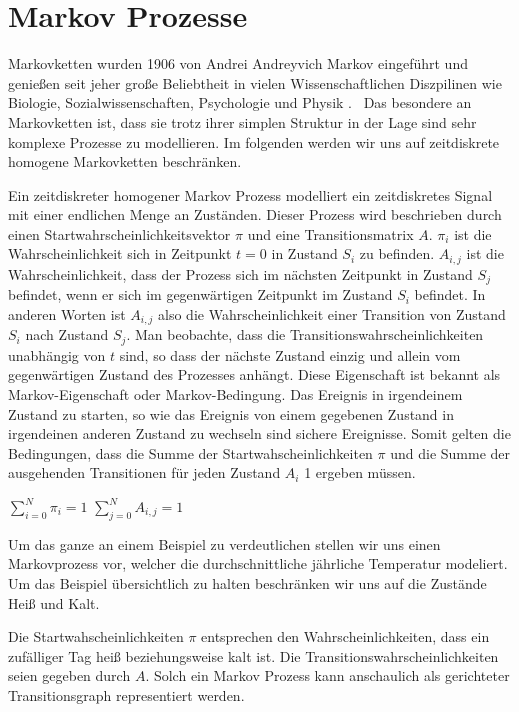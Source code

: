\section{Markov Prozesse}
Markovketten wurden 1906 von Andrei Andreyvich Markov eingeführt und 
genießen seit jeher große Beliebtheit in vielen Wissenschaftlichen 
Diszpilinen wie Biologie, Sozialwissenschaften, Psychologie und Physik .~\cite{gas}
Das besondere an Markovketten ist, dass sie trotz ihrer simplen Struktur 
in der Lage sind sehr komplexe Prozesse zu modellieren.
Im folgenden werden wir uns auf zeitdiskrete homogene Markovketten beschränken.

Ein zeitdiskreter homogener Markov Prozess modelliert ein zeitdiskretes Signal mit einer endlichen Menge an Zuständen.
Dieser Prozess wird beschrieben durch einen Startwahrscheinlichkeitsvektor $\pi$ und eine Transitionsmatrix $A$.
$\pi_i$ ist die Wahrscheinlichkeit sich in Zeitpunkt $t=0$ in Zustand $S_i$ zu befinden.
$A_{i,j}$ ist die Wahrscheinlichkeit, dass der Prozess sich im nächsten Zeitpunkt in Zustand $S_j$ befindet,
wenn er sich im gegenwärtigen Zeitpunkt im Zustand $S_i$ befindet. In anderen Worten ist $A_{i,j}$ also die Wahrscheinlichkeit einer 
Transition von Zustand $S_i$ nach Zustand $S_j$.
Man beobachte, dass die Transitionswahrscheinlichkeiten unabhängig von $t$ sind, so dass der nächste Zustand 
einzig und allein vom gegenwärtigen Zustand des Prozesses anhängt.
Diese Eigenschaft ist bekannt als Markov-Eigenschaft oder Markov-Bedingung.
Das Ereignis in irgendeinem Zustand zu starten, so wie das Ereignis von einem gegebenen Zustand in irgendeinen anderen Zustand zu wechseln sind sichere Ereignisse.
Somit gelten die Bedingungen, dass die Summe der Startwahscheinlichkeiten $\pi$
und die Summe der ausgehenden Transitionen für jeden Zustand $A_i$ 1 ergeben müssen.

$\sum_{i = 0}^{N} \pi_i = 1 $
$\sum_{j = 0}^{N} A_{i,j} = 1 $

Um das ganze an einem Beispiel zu verdeutlichen stellen wir uns einen Markovprozess vor, welcher 
die durchschnittliche jährliche Temperatur modeliert. Um das Beispiel übersichtlich zu halten beschränken wir uns auf die Zustände Heiß und Kalt.

Die Startwahscheinlichkeiten $\pi$ entsprechen den Wahrscheinlichkeiten, dass ein zufälliger Tag heiß beziehungsweise kalt ist.
Die Transitionswahrscheinlichkeiten seien gegeben durch $A$.
Solch ein Markov Prozess kann anschaulich als gerichteter Transitionsgraph representiert werden.

